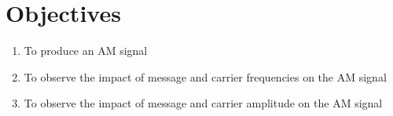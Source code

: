 \section*{Objectives}
\begin{enumerate}
    \item To produce an AM signal
    \item To observe the impact of message and carrier frequencies on the AM signal
    \item To observe the impact of message and carrier amplitude on the AM signal
\end{enumerate}